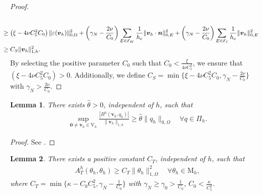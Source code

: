 \documentclass[10pt,a4paper]{article}
\newtheorem{lemma} {\bf Lemma}
\begin{document}
\begin{proof}
\begin{align*}
  	         \\& \hspace{-5mm}  \geq \left(\xi - {4 \nu C_{5}^2}{C_0}\right) \| \varepsilon( \boldsymbol{v}_h) \|^2_{0,\Omega} + \left(\gamma_N-\frac{2 \nu}{C_0}\right) \sum_{E \in \mathcal{E}_W} \frac{1}{h_e} \|\boldsymbol{v}_h \cdot \boldsymbol{n} \|_{0,E}^2 + \left(\gamma_N-\frac{2 \nu}{C_0}\right) \sum_{E \in \mathcal{E}_I} \frac{1}{h_e} \|\boldsymbol{v}_h  \|_{0,E}^2
  	        \\& \hspace{-5mm} \geq C_S \|\boldsymbol{v}_h\|^2_{1,h}.
  			\end{align*}
  			By selecting the positive parameter $C_0$ such that $C_0 < \frac{\xi}{ 4 \nu C_{5}^2 }$, we ensure that $\left(\xi - {4 \nu C_{5}^2}{ C_0}\right) >0 $. Additionally, we define $C_S = \min \{\xi - {4 \nu C_{5}^2}{ C_0},\gamma_N -\frac{2 \nu}{C_0}\}$ with $\gamma_N > \frac{2 \nu}{C_0}$.
  		\end{proof}
  	\begin{lemma}\label{infsup}
  				There exists $\hat{\theta}>0$, independent of $h$, such that
  				\begin{align}\label{46}
  				\sup _{\boldsymbol{0} \neq \boldsymbol{v}_h \in \mathrm{V}_h} \frac{\left | B^h( \boldsymbol{v}_h,q_h) \right | }{\|\boldsymbol{v}_h\|_{1,h}} \geq \hat{\theta} \| q_h \|_{0,\Omega} \quad \forall q \in \Pi_h. 
  				\end{align}
  			\end{lemma}	
  \begin{proof}
 See \cite{MR4812237}. 
\end{proof}	
 \begin{lemma}\label{coercivity_t}
  There exists a positive constant $C_T$, independent of $h$, such that
  			\begin{align}\label{temp_G}
  			A^h_T(\theta_h, \theta_h) \geq C_T \|\theta_h\|^2_{1,\Omega} \quad \forall \theta_h \in \mathrm{M}_h,
  			\end{align}
              where $ C_T = \min \{ \kappa - C_0 C_5^2, \gamma_N - \frac{1}{C_0} \} $ with $\gamma_N \geq \gamma_0 > \frac{1}{C_0}$, $C_0 < \frac{\kappa}{ C_{5}^2 }$.
 \end{lemma}
\end{document}
